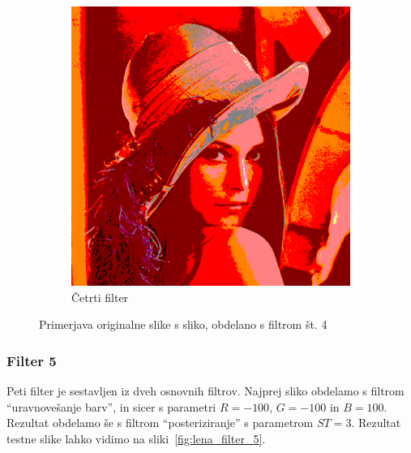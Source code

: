 \documentclass[a4paper, 12pt]{book}
\begin{document}
\begin{figure}[!ht]
\begin{subfigure}[b]{0.4\textwidth}
        \includegraphics[width=\textwidth]{lena_filter_4}
        \caption{Četrti filter}
    \end{subfigure}
    \caption{Primerjava originalne slike s sliko, obdelano s filtrom št. 4}
    \label{fig:lena_filter_4}
\end{figure}


\subsubsection*{Filter 5}
Peti filter je sestavljen iz dveh osnovnih filtrov. Najprej sliko obdelamo s
filtrom ``uravnovešanje barv'', in sicer s parametri $R = -100$, $G = -100$ in
$B = 100$. Rezultat obdelamo še s filtrom ``posteriziranje'' s parametrom
$ST = 3$. Rezultat testne slike lahko vidimo na sliki~\ref{fig:lena_filter_5}.
\end{document}
